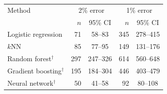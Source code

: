 \begin{tabular}{lrcrc}
\toprule
Method & \multicolumn{2}{c}{2\% error} & \multicolumn{2}{c}{1\% error} \\
 & $n$ & 95\% CI & $n$ & 95\% CI \\
\midrule
Logistic regression & 71 & 58--83 & 345 & 278--415 \\
$k$NN & 85 & 77--95 & 149 & 131--176 \\
Random forest$^\dagger$ & 297 & 247--326 & 614 & 560--648 \\
Gradient boosting$^\dagger$ & 195 & 184--304 & 446 & 403--479 \\
Neural network$^\dagger$ & 50 & 41--58 & 92 & 80--108 \\
\bottomrule
\end{tabular}
